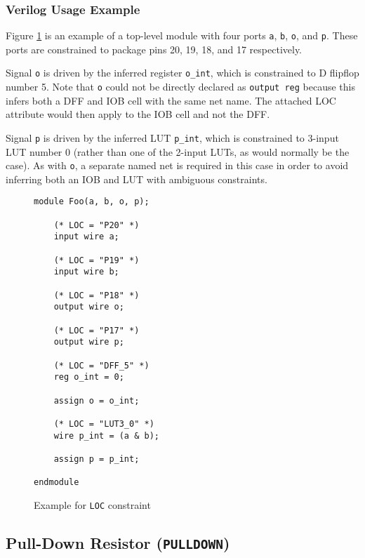\documentclass[11pt]{article}
\newcommand{\tokenstyle}[1]{\texttt{#1}}
\newcommand{\wirestyle}[1]{\texttt{#1}}
\begin{document}
\pagebreak
\subsubsection{Verilog Usage Example}

Figure \ref{constraint-loc} is an example of a top-level module with four ports \wirestyle{a}, \wirestyle{b},
\wirestyle{o}, and \wirestyle{p}. These ports are constrained to package pins 20, 19, 18, and 17 respectively.

Signal \wirestyle{o} is driven by the inferred register \wirestyle{o\_int}, which is constrained to D flipflop
number 5. Note that \wirestyle{o} could not be directly declared as \tokenstyle{output reg} because this infers both a
DFF and IOB cell with the same net name. The attached LOC attribute would then apply to the IOB cell and not the DFF.

Signal \wirestyle{p} is driven by the inferred LUT \wirestyle{p\_int}, which is constrained to 3-input LUT number 0
(rather than one of the 2-input LUTs, as would normally be the case). As with \wirestyle{o}, a separate named net is
required in this case in order to avoid inferring both an IOB and LUT with ambiguous constraints.

\begin{figure}[h]
\begin{lstlisting}
module Foo(a, b, o, p);

	(* LOC = "P20" *)
	input wire a;

	(* LOC = "P19" *)
	input wire b;

	(* LOC = "P18" *)
	output wire o;

	(* LOC = "P17" *)
	output wire p;

	(* LOC = "DFF_5" *)
	reg o_int = 0;

	assign o = o_int;

	(* LOC = "LUT3_0" *)
	wire p_int = (a & b);

	assign p = p_int;

endmodule
\end{lstlisting}
\caption{Example for \tokenstyle{LOC} constraint}
\label{constraint-loc}
\end{figure}


\clearpage
\pagebreak
\subsection{Pull-Down Resistor (\tokenstyle{PULLDOWN})}
\end{document}
